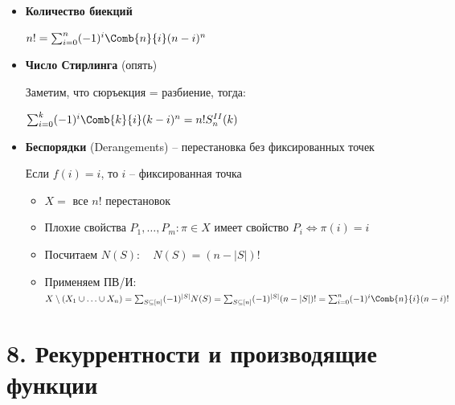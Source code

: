 \documentclass[12pt]{article}
\begin{document}
\begin{itemize}
\begin{itemize}
            \item Плохое свойство $P_i \ : \ X_i = \Set{f : [k] \to [n] \ | \ \nexists j \in [k] : f(j) = i}$

            \item $|\Set{\text{сюръекции } f : [k] \to [n]}| = |X \setminus (X_1 \union \dots \union X_m)| \stackrel{\text{PIE}}{=}
            \sum_{S \subseteq [m]} (-1)^{|S|} |N(S)| = \sum_{S \subseteq [m]} (-1)^{|S|} (n - |S|)^k =
            \sum^k_{i = 0} (-1)^{i} \Comb{k}{i} (k - i)^n$
        \end{itemize}

        \mediumvspace

        \item \textbf{Количество биекций}

        $n! = \sum_{i=0}^n (-1)^i \Comb{n}{i} (n - i)^n$

        \item \textbf{Число Стирлинга} (опять)

        Заметим, что сюръекция = разбиение, тогда:

        $\sum^k_{i = 0} (-1)^{i} \Comb{k}{i} (k - i)^n = n! S^{II}_n (k)$

        \mediumvspace

        \item \textbf{Беспорядки} (Derangements) -- перестановка без фиксированных точек

        Если $f(i) = i$, то $i$ -- фиксированная точка

        \begin{itemize}
            \item $X = $ все $n!$ перестановок

            \item Плохие свойства $P_1,\dots,P_m : \pi \in X$ имеет свойство $P_i \Longleftrightarrow \pi(i) = i$

            \item Посчитаем $N(S): \quad N(S) = (n - |S|)!$

            \item Применяем ПВ/И: $X \setminus (X_1 \union \dots \union X_n) = \sum_{S \subseteq [n]} (-1)^{|S|} N(S) =
            \sum_{S \subseteq [n]} (-1)^{|S|} (n - |S|)! = \sum_{i = 0}^n (-1)^{i} \Comb{n}{i} (n - i)!$
        \end{itemize}
    \end{itemize}

    \clearpage


    \section{8. Рекуррентности и производящие функции}
\end{document}
